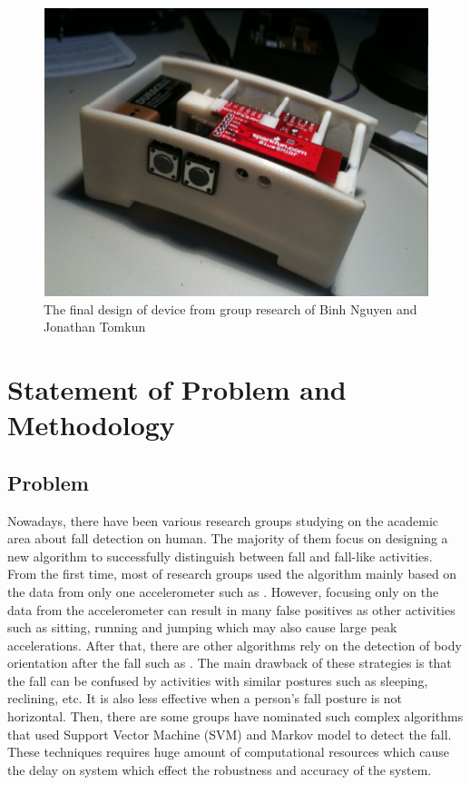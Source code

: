 \documentclass[letterpaper,12pt,titlepage,oneside,final]{book}
\begin{document}
 \begin{figure}[h!]
	\centering
	\includegraphics[scale=0.7]{binhnguyen_device}
	\caption{The final design of device from group research of Binh Nguyen and Jonathan Tomkun}
\end{figure}  

\chapter{Statement of Problem and Methodology}

\section{Problem}
Nowadays, there have been various research groups studying on the academic area about fall detection on human. The majority of them focus on designing a new algorithm to successfully distinguish between fall and fall-like activities. From the first time, most of research groups used the algorithm mainly based on the data from only one accelerometer such as \cite{only_accel_1}\cite{only_accel_2}\cite{only_accel_3}. However, focusing only on the data from the accelerometer can result in many false positives as other activities such as sitting, running and jumping which may also cause large peak accelerations. After that, there are other algorithms rely on the detection of body orientation after the fall such as \cite{body_orientation_1}\cite{body_orientation_2}. The main drawback of these strategies is that the fall can be confused by activities with similar postures such as sleeping, reclining, etc. It is also less effective when a person's fall posture is not horizontal. Then, there are some groups have nominated such complex algorithms that used Support Vector Machine (SVM)\cite{SVM} and Markov model \cite{markov} to detect the fall. These techniques requires huge amount of computational resources which cause the delay on system which effect the robustness and accuracy of the system. 	
\end{document}
